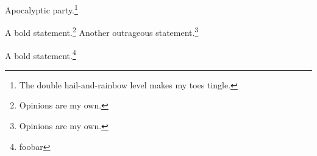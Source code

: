 Apocalyptic party.\footnote{The double hail-and-rainbow level makes my toes tingle.}

A bold statement.\footnote{Opinions are my own.}
Another outrageous statement.\footnote{Opinions are my own.}

A bold statement.\footnote{foobar}
